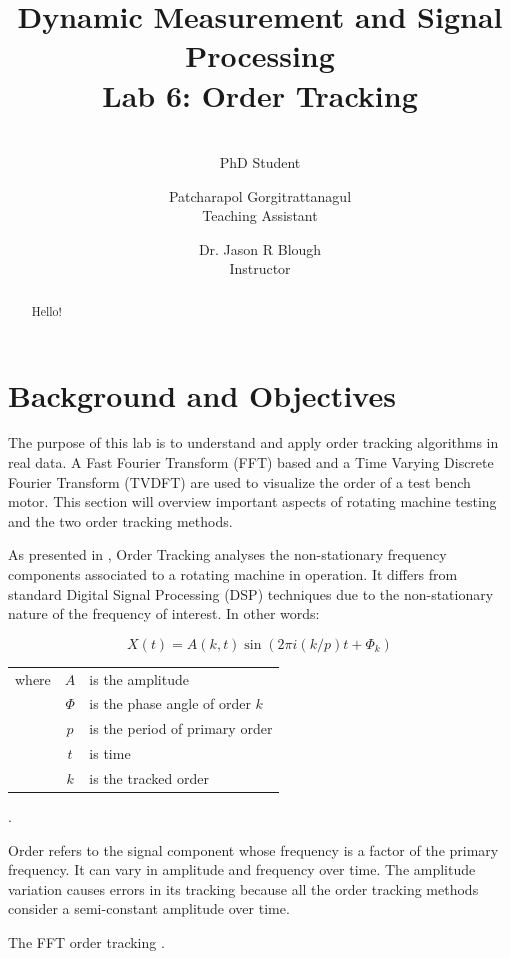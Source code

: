 \documentclass[10pt,letterpaper,twocolumn]{article}
\author{\makebox[.9\textwidth]{Guilherme Aramizo Ribeiro}\\PhD Student 
\and Patcharapol Gorgitrattanagul \\Teaching Assistant \and Dr. Jason R Blough\\Instructor}
\title{Dynamic Measurement and Signal Processing \\Lab 6: Order Tracking}
\begin{document}
\maketitle

\begin{abstract}
    Hello! 
    
\end{abstract}

\section{Background and Objectives}

	The purpose of this lab is to understand and apply order tracking algorithms in real data. A Fast Fourier Transform (FFT) based and a Time Varying Discrete Fourier Transform (TVDFT) are used to visualize the order of a test bench motor. This section will overview important aspects of rotating machine testing and the two order tracking methods.
	
	As presented in \cite{blough1}, Order Tracking analyses the non-stationary frequency components associated to a rotating machine in operation. It differs from standard Digital Signal Processing (DSP) techniques due to the non-stationary nature of the frequency of interest. In other words:
	
	\begin{equation}
	X(t) = A(k,t)\sin(2 \pi i (k/p) t + \Phi _k)
	\end{equation}	 

	\begin{tabular}{r c m{5 cm}}
	where & $ A $ & is the amplitude \\ 
	 & $ \Phi $ & is the phase angle of order $ k $ \\ 
	 & $ p $ & is the period of primary order \\ 
	 & $ t $ & is time \\ 
	 & $ k $ & is the tracked order \\ 
	\end{tabular} 
	.
	
	Order refers to the signal component whose frequency is a factor of the primary frequency. It can vary in amplitude and frequency over time. The amplitude variation causes errors in its tracking because all the order tracking methods consider a semi-constant amplitude over time.
	
	The FFT order tracking .
	
\end{document}

